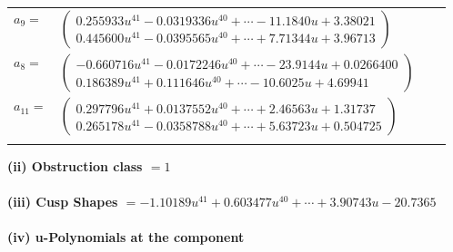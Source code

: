 \documentclass[1p]{elsarticle_modified}
\theoremstyle{definition}
\begin{document}
\begin{tabular}{m{7pt} m{180pt} m{7pt} m{180pt} }
\flushright $a_{9}=$&$\begin{pmatrix}0.255933 u^{41}-0.0319336 u^{40}+\cdots-11.1840 u+3.38021\\0.445600 u^{41}-0.0395565 u^{40}+\cdots+7.71344 u+3.96713\end{pmatrix}$ \\
\flushright $a_{8}=$&$\begin{pmatrix}-0.660716 u^{41}-0.0172246 u^{40}+\cdots-23.9144 u+0.0266400\\0.186389 u^{41}+0.111646 u^{40}+\cdots-10.6025 u+4.69941\end{pmatrix}$ \\
\flushright $a_{11}=$&$\begin{pmatrix}0.297796 u^{41}+0.0137552 u^{40}+\cdots+2.46563 u+1.31737\\0.265178 u^{41}-0.0358788 u^{40}+\cdots+5.63723 u+0.504725\end{pmatrix}$\\&\end{tabular}
\flushleft \textbf{(ii) Obstruction class $= 1$}\\~\\
\flushleft \textbf{(iii) Cusp Shapes $= -1.10189 u^{41}+0.603477 u^{40}+\cdots+3.90743 u-20.7365$}\\~\\
\newpage\renewcommand{\arraystretch}{1}
\flushleft \textbf{(iv) u-Polynomials at the component}\newline \\
\end{document}
